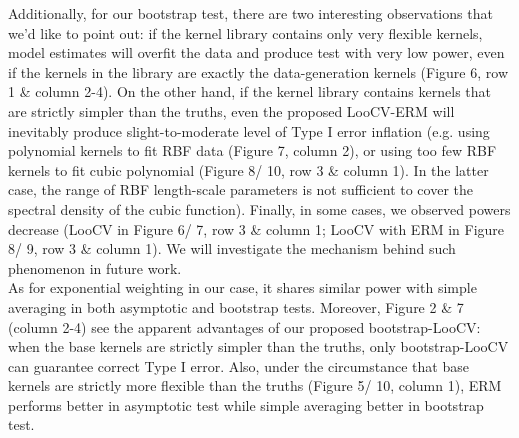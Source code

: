 \documentclass[11pt]{article}
\begin{document}
Additionally, for our bootstrap test, there are two interesting observations that we'd like to point out: if the kernel library contains only very flexible kernels, model estimates will overfit the data and produce test with very low power, even if the kernels in the library are exactly the data-generation kernels (Figure 6, row 1 \& column 2-4). On the other hand, if the kernel library contains kernels that are strictly simpler than the truths, even the proposed LooCV-ERM will inevitably produce slight-to-moderate level of Type I error inflation (e.g. using polynomial kernels to fit RBF data (Figure 7, column 2), or using too few RBF kernels to fit cubic polynomial (Figure 8/ 10, row 3 \& column 1). In the latter case, the range of RBF length-scale parameters is not sufficient to cover the spectral density of the cubic function). Finally, in some cases, we observed powers decrease (LooCV in Figure 6/ 7, row 3 \& column 1; LooCV with ERM in Figure 8/ 9, row 3 \& column 1). We will investigate the mechanism behind such phenomenon in future work.\\

As for exponential weighting in our case, it shares similar power with simple averaging in both asymptotic and bootstrap tests. Moreover, Figure 2 \& 7 (column 2-4) see the apparent advantages of our proposed bootstrap-LooCV: when the base kernels are strictly simpler than the truths, only bootstrap-LooCV can guarantee correct Type I error. Also, under the circumstance that base kernels are strictly more flexible than the truths (Figure 5/ 10, column 1), ERM performs better in asymptotic test while simple averaging better in bootstrap test.
\end{document}
